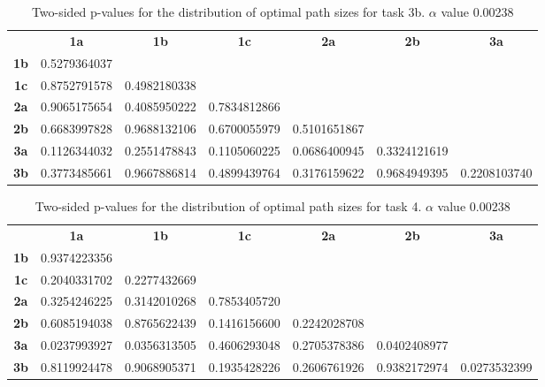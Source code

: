 \begin{table}[h!]
    \centering
    \begin{tabular}{ccccccc}
                & \textbf{1a}  & \textbf{1b}  & \textbf{1c}  & \textbf{2a}  & \textbf{2b}  & \textbf{3a}  \\
    \textbf{1b} & 0.5279364037 &              &              &              &              &              \\
    \textbf{1c} & 0.8752791578 & 0.4982180338 &              &              &              &              \\
    \textbf{2a} & 0.9065175654 & 0.4085950222 & 0.7834812866 &              &              &              \\
    \textbf{2b} & 0.6683997828 & 0.9688132106 & 0.6700055979 & 0.5101651867 &              &              \\
    \textbf{3a} & 0.1126344032 & 0.2551478843 & 0.1105060225 & 0.0686400945 & 0.3324121619 &              \\
    \textbf{3b} & 0.3773485661 & 0.9667886814 & 0.4899439764 & 0.3176159622 & 0.9684949395 & 0.2208103740
    \end{tabular}
    \caption[p-table for path sizes (task 3b)]{Two-sided p-values for the distribution of optimal path sizes for task 3b. \(\alpha\) value 0.00238}
    \label{tab:exp2.pathsize3b}
\end{table}

\begin{table}[h!]
    \centering
    \begin{tabular}{ccccccc}
                & \textbf{1a}  & \textbf{1b}  & \textbf{1c}  & \textbf{2a}  & \textbf{2b}  & \textbf{3a}  \\
    \textbf{1b} & 0.9374223356 &              &              &              &              &              \\
    \textbf{1c} & 0.2040331702 & 0.2277432669 &              &              &              &              \\
    \textbf{2a} & 0.3254246225 & 0.3142010268 & 0.7853405720 &              &              &              \\
    \textbf{2b} & 0.6085194038 & 0.8765622439 & 0.1416156600 & 0.2242028708 &              &              \\
    \textbf{3a} & 0.0237993927 & 0.0356313505 & 0.4606293048 & 0.2705378386 & 0.0402408977 &              \\
    \textbf{3b} & 0.8119924478 & 0.9068905371 & 0.1935428226 & 0.2606761926 & 0.9382172974 & 0.0273532399
    \end{tabular}
    \caption[p-table for path sizes (task 4)]{Two-sided p-values for the distribution of optimal path sizes for task 4. \(\alpha\) value 0.00238}
    \label{tab:exp2.pathsize4}
\end{table}

\newpage